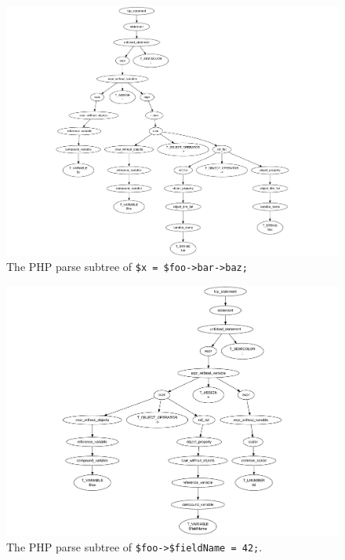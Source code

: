 \begin{figure}[htb]
  \begin{center}
    \includegraphics[trim = 30mm 0mm 0mm 20mm, scale=0.8]{images/multi-level-field-access-right}
   \caption{The PHP parse subtree of \texttt{\$x = \$foo->bar->baz;}}
   \label{fig:multi-level-field-access-right}
  \end{center}
\end{figure}

\begin{figure}[htb]
  \begin{center}
    \includegraphics[trim = 60mm 0mm 0mm 10mm, scale=0.8]{images/variable-field-access-left}
   \caption{The PHP parse subtree of \texttt{\$foo->\$fieldName = 42;}.}
   \label{fig:variable-field-access-left}
  \end{center}
\end{figure}

